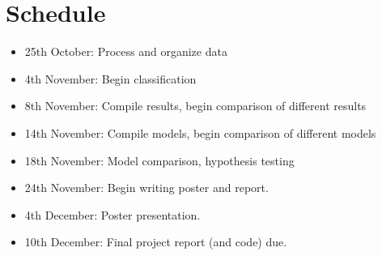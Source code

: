 \documentclass{article}
\begin{document}
\newpage
\section{Schedule}

\begin{itemize}
\item 25th October: Process and organize data
\item 4th November: Begin classification
\item 8th November: Compile results, begin comparison of different results
\item 14th November: Compile models, begin comparison of different models
\item 18th November: Model comparison, hypothesis testing
\item 24th November: Begin writing poster and report.
\item 4th December: Poster presentation.
\item 10th December: Final project report (and code) due.
\end{itemize}
\end{document}

